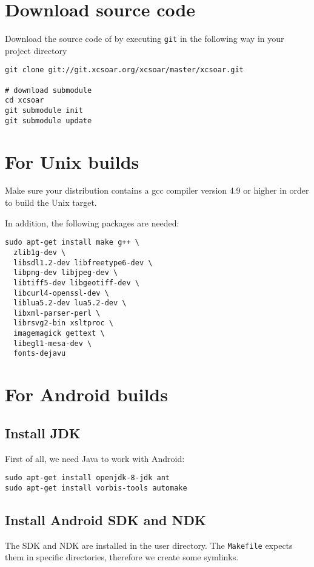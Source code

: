 \section{Download source code}\label{sec:developsetup-sourcecode}

Download the source code of \xc by executing \texttt{git} in the following way in your project directory
\begin{verbatim}
git clone git://git.xcsoar.org/xcsoar/master/xcsoar.git

# download submodule
cd xcsoar
git submodule init
git submodule update
\end{verbatim}

\section{For Unix builds}

Make sure your distribution contains a gcc compiler version 4.9 or higher in order to build the Unix target.

In addition, the following packages are needed:

\begin{verbatim}
sudo apt-get install make g++ \
  zlib1g-dev \
  libsdl1.2-dev libfreetype6-dev \
  libpng-dev libjpeg-dev \
  libtiff5-dev libgeotiff-dev \
  libcurl4-openssl-dev \
  liblua5.2-dev lua5.2-dev \
  libxml-parser-perl \
  librsvg2-bin xsltproc \
  imagemagick gettext \
  libegl1-mesa-dev \
  fonts-dejavu
\end{verbatim}

\section{For Android  builds}
\subsection{Install JDK}
First of all, we need Java to work with Android:

\begin{verbatim}
sudo apt-get install openjdk-8-jdk ant
sudo apt-get install vorbis-tools automake
\end{verbatim}

\subsection{Install Android SDK and NDK}

The SDK and NDK are installed in the user directory. The \texttt{Makefile} expects them in specific directories, therefore we create some symlinks.

